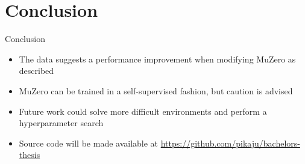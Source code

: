 \section{Conclusion}

\begin{frame}{Conclusion}
    \begin{itemize}
        \item The data suggests a performance improvement when modifying MuZero as described
        \item MuZero can be trained in a self-supervised fashion, but caution is advised
        \item Future work could solve more difficult environments and perform a hyperparameter search
        \item Source code will be made available at \url{https://github.com/pikaju/bachelors-thesis}
    \end{itemize}
\end{frame}
